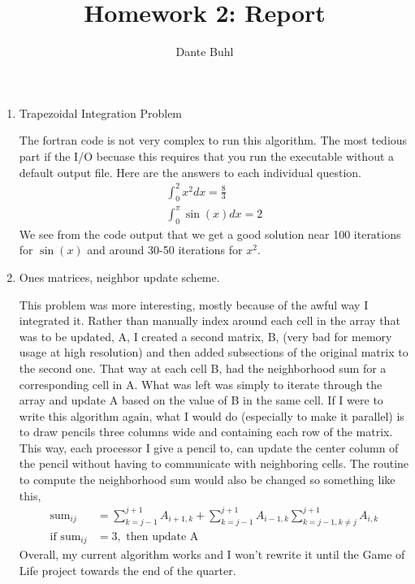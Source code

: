 \documentclass{article}
\title{Homework 2: Report}
\author{Dante Buhl}
\begin{document}
\newcommand{\bs}[1]{\boldsymbol{#1}}
\newcommand{\bmp}[1]{\begin{minipage}{#1\textwidth}}
\newcommand{\emp}{\end{minipage}}
\newcommand{\R}{\mathbb{R}}
\newcommand{\C}{\mathbb{C}}
\newcommand{\N}{\mathcal{N}}
\newcommand{\I}{\mathrm{I}}
\newcommand{\K}{\bs{\mathrm{K}}}
\newcommand{\m}{\bs{\mu}_*}
\newcommand{\s}{\bs{\Sigma}_*}
\newcommand{\dt}{\Delta t}
\newcommand{\tr}[1]{\text{Tr}(#1)}
\newcommand{\Tr}[1]{\text{Tr}(#1)}

\maketitle



\begin{enumerate}

    \item Trapezoidal Integration Problem

    The fortran code is not very complex to run this algorithm. The most tedious part if the I/O becuase this requires that you run the executable without a default output file. Here are the answers to each individual question. 
    \begin{align}
        \int_0^2 x^2 dx = \frac{8}{3} \\
        \int_0^{\pi} \sin(x) dx = 2
    \end{align}
    We see from the code output that we get a good solution near 100 iterations for $\sin(x)$ and around 30-50 iterations for $x^2$. 

   \item Ones matrices, neighbor update scheme. 
    
    This problem was more interesting, mostly because of the awful way I integrated it. Rather than manually index around each cell in the array that was to be updated, A, I created a second matrix, B, (very bad for memory usage at high resolution) and then added subsections of the original matrix to the second one. That way at each cell B, had the neighborhood sum for a corresponding cell in A. What was left was simply to iterate through the array and update A based on the value of B in the same cell. If I were to write this algorithm again, what I would do (especially to make it parallel) is to draw pencils three columns wide and containing each row of the matrix. This way, each processor I give a pencil to, can update the center column of the pencil without having to communicate with neighboring cells. The routine to compute the neighborhood sum would also be changed so something like this, 
    \begin{align}
        \text{sum}_{ij} &= \sum_{k = j-1}^{j+1} A_{i+1, k} +\sum_{k = j-1}^{j+1} A_{i-1, k} 
\sum_{k = j-1, k \neq j}^{j+1} A_{i, k} \\
        \text{if sum}_{ij} &= 3, \text{ then update A}
    \end{align}
    Overall, my current algorithm works and I won't rewrite it until the Game of Life project towards the end of the quarter. 
\end{enumerate}
\end{document}
